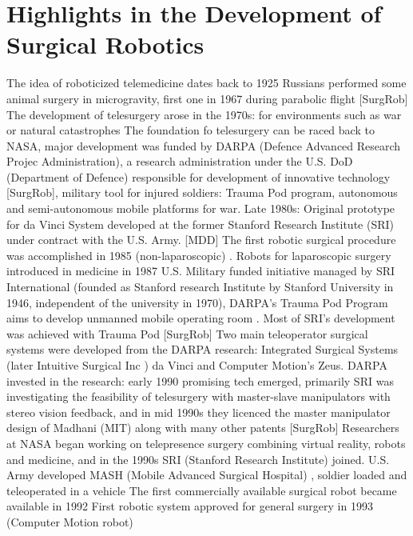 \section{Highlights in the Development of Surgical Robotics}
The idea of roboticized telemedicine dates back to 1925 \citep{bib:telemed_predict}
Russians performed some animal surgery in microgravity, first one in 1967 during parabolic flight [SurgRob]
The development of telesurgery arose in the 1970s: for environments such as war or natural catastrophes
The foundation fo telesurgery can be raced back to NASA, major development was funded by DARPA (Defence Advanced Research Projec Administration), a research administration under the U.S. DoD (Department of Defence) responsible for development of innovative technology [SurgRob], military tool for injured soldiers: Trauma Pod program, autonomous and semi-autonomous mobile platforms for war.
Late 1980s: Original prototype for da Vinci System developed at the former Stanford Research Institute (SRI) under contract with the U.S. Army. [MDD]
The first robotic surgical procedure was accomplished in 1985 (non-laparoscopic) \citep{bib:telesurg_history}. %
Robots for laparoscopic surgery introduced in medicine in 1987 \citep{bib:brown_univ}
U.S. Military funded initiative managed by SRI International (founded as Stanford research Institute by Stanford University in 1946, independent of the university in 1970), DARPA's Trauma Pod Program aims to develop unmanned mobile operating room \citep{bib:docatadist}. Most of SRI's development was achieved with Trauma Pod [SurgRob]
Two main teleoperator surgical systems were developed from the DARPA research: Integrated Surgical Systems (later Intuitive Surgical Inc \citep{bib:brown_univ}) da Vinci and Computer Motion's Zeus. \citep{bib:telesurg_history}
DARPA invested in the research: early 1990 promising tech emerged, primarily SRI was investigating the feasibility of telesurgery with master-slave manipulators with stereo vision feedback, and in mid 1990s they licenced the master manipulator design of Madhani (MIT) along with many other patents [SurgRob]
Researchers at NASA began working on telepresence surgery combining virtual reality, robots and medicine, and in the 1990s SRI (Stanford Research Institute) joined. \citep{bib:brown_univ}
U.S. Army developed MASH (Mobile Advanced Surgical Hospital) \citep{bib:brown_univ}, soldier loaded and teleoperated in a vehicle
The first commercially available surgical robot became available in 1992\citep{bib:telesurg_history}
First robotic system approved for general surgery in 1993 (Computer Motion robot) \citep{bib:telesurg_history}
